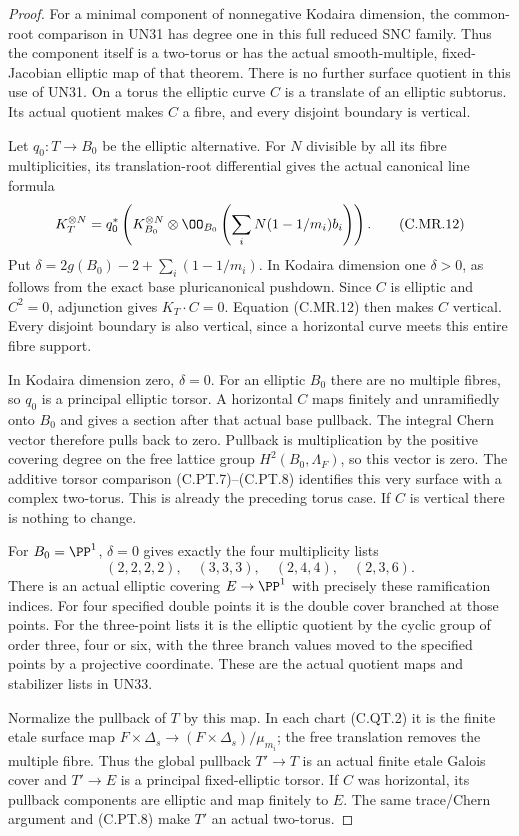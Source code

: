 \begin{proof}
For a minimal component of nonnegative
Kodaira dimension, the common-root
comparison in UN31 has degree one in
this full reduced SNC family. Thus
the component itself is a two-torus
or has the actual smooth-multiple,
fixed-Jacobian elliptic map of that
theorem. There is no further surface
quotient in this use of UN31.
On a torus the elliptic curve $C$
is a translate of an elliptic subtorus.
Its actual quotient makes $C$ a fibre,
and every disjoint boundary is vertical.

Let $q_0:T\to B_0$ be the elliptic
alternative. For $N$ divisible by
all its fibre multiplicities, its
translation-root differential gives
the actual canonical line formula
\[
 K_T^{\otimes N}
  =q_0^*\left(K_{B_0}^{\otimes N}
       \otimes\OO_{B_0}
          \left(\sum_iN(1-1/m_i)b_i\right)\right).
\tag{C.MR.12}
\]
Put $\delta=2g(B_0)-2+\sum_i(1-1/m_i)$.
In Kodaira dimension one $\delta>0$,
as follows from the exact base
pluricanonical pushdown. Since
$C$ is elliptic and $C^2=0$,
adjunction gives $K_T\cdot C=0$.
Equation (C.MR.12) then makes $C$
vertical. Every disjoint boundary
is also vertical, since a horizontal
curve meets this entire fibre support.

In Kodaira dimension zero, $\delta=0$.
For an elliptic $B_0$ there are no
multiple fibres, so $q_0$ is a
principal elliptic torsor. A horizontal
$C$ maps finitely and unramifiedly
onto $B_0$ and gives a section after
that actual base pullback. The integral
Chern vector therefore pulls back to
zero. Pullback is multiplication by
the positive covering degree on the
free lattice group $H^2(B_0,\Lambda_F)$,
so this vector is zero. The additive
torsor comparison (C.PT.7)--(C.PT.8)
identifies this very surface with
a complex two-torus. This is already
the preceding torus case. If $C$ is
vertical there is nothing to change.

For $B_0=\PP^1$, $\delta=0$ gives
exactly the four multiplicity lists
\[
       (2,2,2,2),\quad(3,3,3),\quad
                       (2,4,4),\quad(2,3,6).
\tag{C.MR.13}
\]
There is an actual elliptic covering
$E\to\PP^1$ with precisely these
ramification indices. For four
specified double points it is the
double cover branched at those
points. For the three-point lists
it is the elliptic quotient by
the cyclic group of order three,
four or six, with the three
branch values moved to the
specified points by a projective
coordinate. These are the actual
quotient maps and stabilizer lists
in UN33.

Normalize the pullback of $T$ by
this map. In each chart (C.QT.2)
it is the finite etale surface
map $F\times\Delta_s\to
(F\times\Delta_s)/\mu_{m_i}$;
the free translation removes
the multiple fibre. Thus the
global pullback $T'\to T$ is
an actual finite etale Galois
cover and $T'\to E$ is a
principal fixed-elliptic torsor.
If $C$ was horizontal, its
pullback components are elliptic
and map finitely to $E$.
The same trace/Chern argument
and (C.PT.8) make $T'$ an
actual two-torus.


\end{proof}
